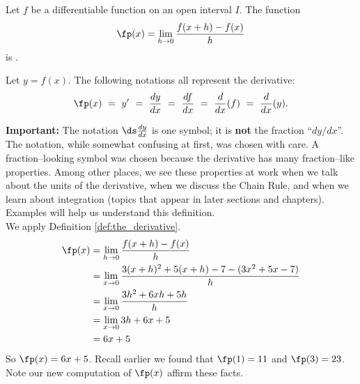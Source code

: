 {Let $f$ be a differentiable function on an open interval $I$. The function $$\fp(x) = \lim_{h\to 0} \frac{f(x+h)-f(x)}{h}$$ is .\\


Let $y = f(x)$. The following notations all represent the derivative:
$$\fp(x)\ =\ y'\ =\ \frac{dy}{dx}\ =\ \frac{df}{dx}\ =\ \frac{d}{dx}(f)\ =\ \frac{d}{dx}(y). $$}
\setlength{\specialboxlength}{\textwidth-2\specialboxinnerseplength}

\noindent\textbf{Important:} The notation $\ds \frac{dy}{dx}$ is one symbol; it is \textbf{not} the fraction ``$dy/dx$''. The notation, while somewhat confusing at first, was chosen with care. A fraction--looking symbol was chosen because the derivative has many fraction--like properties. Among other places, we see these properties at work when we talk about the units of the derivative, when we discuss the Chain Rule, and when we learn about integration (topics that appear in later sections and chapters).\\

Examples will help us understand this definition.\\

{We apply Definition \ref{def:the_derivative}.
	\begin{align*}
	\fp(x) &= \lim_{h\to 0} \frac{f(x+h)-f(x)}{h} \\
					&=	\lim_{x\to 0} \frac{3(x+h)^2+5(x+h)-7-(3x^2+5x-7)}{h}\\
					&=	\lim_{x\to 0} \frac{3h^2 +6xh+5h}{h}\\
					&= \lim_{x\to 0} 3h+6x+5\\
					&= 6x+5
	\end{align*}
	So $\fp(x) = 6x+5$. Recall earlier we found that $\fp(1) = 11$ and $\fp(3) = 23$. Note our new computation of $\fp(x)$ affirm these facts.
}\\

